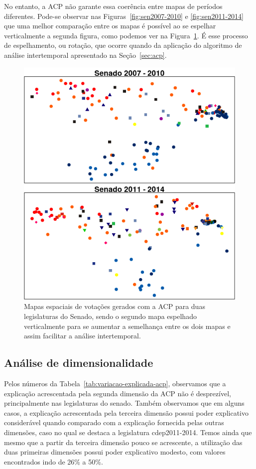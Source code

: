 \documentclass[
	article,			%
	12pt,				%
    twoside,			%
	a4paper,			%
	english,			%
	french,				%
	spanish,			%
	brazil,				%
	]{abntex2}
\begin{document}
No entanto, a ACP não garante essa coerência entre mapas de períodos diferentes. Pode-se observar nas Figuras~\ref{fig:sen2007-2010} e \ref{fig:sen2011-2014} que uma melhor comparação entre os mapas é possível ao se espelhar verticalmente a segunda figura, como podemos ver na Figura~\ref{fig:sen-rotacao}. É esse processo de espelhamento, ou rotação, que ocorre quando da aplicação do algoritmo de análise intertemporal apresentado na Seção~\ref{sec:acp}.

\begin{figure}[h!]
  \centering
  \includegraphics[scale=0.7]{figs/sen-rotacao.png}
  \caption{Mapas espaciais de votações gerados com a ACP para duas legislaturas do Senado, sendo o segundo mapa espelhado verticalmente para se aumentar a semelhança entre os dois mapas e assim facilitar a análise intertemporal.}
  \label{fig:sen-rotacao}
\end{figure}

\subsection{Análise de dimensionalidade}

Pelos números da Tabela~\ref{tab:variacao-explicada-acp}, observamos que a explicação acrescentada pela segunda dimensão da ACP não é desprezível, principalmente nas legislaturas do senado. Também observamos que em alguns casos, a explicação acrescentada pela terceira dimensão possui poder explicativo considerável quando comparado com a explicação fornecida pelas outras dimensões, caso no qual se destaca a legislatura cdep2011-2014. Temos ainda que mesmo que a partir da terceira dimensão pouco se acrescente, a utilização das duas primeiras dimensões possui poder explicativo modesto, com valores encontrados indo de 26\% a 50\%. 
\end{document}
